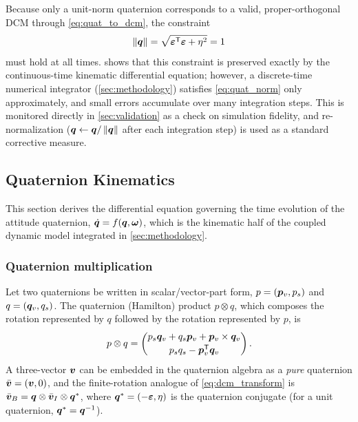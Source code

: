 Because only a unit-norm quaternion corresponds to a valid, proper-orthogonal DCM through \cref{eq:quat_to_dcm}, the constraint
\begin{equation}
    \left\lVert \bm{q} \right\rVert = \sqrt{\bm{\varepsilon}^{\mathsf{T}}\bm{\varepsilon} + \eta^2} = 1
    \label{eq:quat_norm}
\end{equation}
must hold at all times.  shows that this constraint is preserved exactly by the continuous-time kinematic differential equation; however, a discrete-time numerical integrator (\cref{sec:methodology}) satisfies \cref{eq:quat_norm} only approximately, and small errors accumulate over many integration steps. This is monitored directly in \cref{sec:validation} as a check on simulation fidelity, and re-normalization ($\bm{q} \leftarrow \bm{q}/\left\lVert \bm{q} \right\rVert$ after each integration step) is used as a standard corrective measure.

\subsection{Quaternion Kinematics}
\label{sec:kinematics}

This section derives the differential equation governing the time evolution of the attitude quaternion, $\dot{\bm{q}} = f(\bm{q}, \bm{\omega})$, which is the kinematic half of the coupled dynamic model integrated in \cref{sec:methodology}.

\subsubsection{Quaternion multiplication}

Let two quaternions be written in scalar/vector-part form, $p = (\bm{p}_v, p_s)$ and $q = (\bm{q}_v, q_s)$. The quaternion (Hamilton) product $p\otimes q$, which composes the rotation represented by $q$ followed by the rotation represented by $p$, is
\begin{equation}
    p \otimes q = \begin{pmatrix} p_s\bm{q}_v + q_s\bm{p}_v + \bm{p}_v\times\bm{q}_v \\[2pt] p_s q_s - \bm{p}_v^{\mathsf{T}}\bm{q}_v \end{pmatrix}.
    \label{eq:quat_product}
\end{equation}
A three-vector $\bm{v}$ can be embedded in the quaternion algebra as a \emph{pure} quaternion $\bar{\bm{v}} = (\bm{v}, 0)$, and the finite-rotation analogue of \cref{eq:dcm_transform} is $\bar{\bm{v}}_B = \bm{q}\otimes\bar{\bm{v}}_I\otimes\bm{q}^{*}$, where $\bm{q}^{*} = (-\bm{\varepsilon}, \eta)$ is the quaternion conjugate (for a unit quaternion, $\bm{q}^{*} = \bm{q}^{-1}$).

